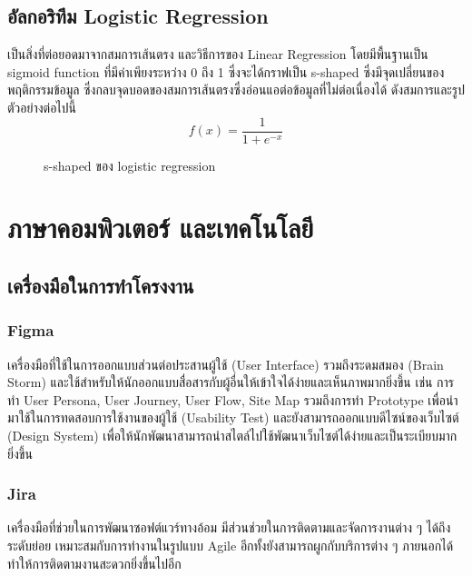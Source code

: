 \subsection{อัลกอริทึม Logistic Regression}
เป็นสิ่งที่ต่อยอดมาจากสมการเส้นตรง และวิธีการของ Linear Regression โดยมีพื้นฐานเป็น sigmoid function ที่มีค่าเพียงระหว่าง 0 ถึง 1 ซึ่งจะได้กราฟเป็น s-shaped ซึ่งมีจุดเปลี่ยนของพฤติกรรมข้อมูล ซึ่งกลบจุดบอดของสมการเส้นตรงซึ่งอ่อนแอต่อข้อมูลที่ไม่ต่อเนื่องได้ ดังสมการและรูปตัวอย่างต่อไปนี้
\[f(x) = \frac{1}{1+e^{-x}}\]
\begin{figure}[H]\centering
      \setlength{\fboxrule}{0.2mm}
      \setlength{\fboxsep}{0.5cm}
      \caption{s-shaped ของ logistic regression}\label{fig:s-shaped}
\end{figure}

\section{ภาษาคอมพิวเตอร์ และเทคโนโลยี}
\subsection{เครื่องมือในการทำโครงงาน}
\subsubsection{Figma}
\label{subsec:Figma}
เครื่องมือที่ใช้ในการออกแบบส่วนต่อประสานผู้ใช้ (User Interface) รวมถึงระดมสมอง (Brain Storm)
และใช้สำหรับให้นักออกแบบสื่อสารกับผู้อื่นให้เข้าใจได้ง่ายและเห็นภาพมากยิ่งขึ้น
เช่น การทำ User Persona, User Journey, User Flow, Site Map รวมถึงการทำ
Prototype เพื่อนำมาใช้ในการทดสอบการใช้งานของผู้ใช้ (Usability Test)
และยังสามารถออกแบบดีไซน์ของเว็บไซต์ (Design System)
เพื่อให้นักพัฒนาสามารถนำสไตล์ไปใช้พัฒนาเว็บไซต์ได้ง่ายและเป็นระเบียบมากยิ่งขึ้น
\subsubsection{Jira}
เครื่องมือที่ช่วยในการพัฒนาซอฟต์แวร์ทางอ้อม มีส่วนช่วยในการติดตามและจัดการงานต่าง ๆ
ได้ถึงระดับย่อย เหมาะสมกับการทำงานในรูปแบบ Agile อีกทั้งยังสามารถผูกกับบริการต่าง ๆ
ภายนอกได้ ทำให้การติดตามงานสะดวกยิ่งขึ้นไปอีก
